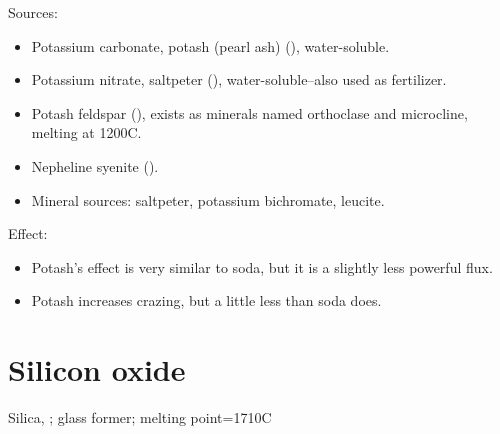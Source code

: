 Sources:
\begin{itemize}
  \item Potassium carbonate, potash (pearl ash) (), water-soluble.
  \item Potassium nitrate, saltpeter (), water-soluble--also used as 
  fertilizer.
  \item Potash feldspar (), exists as minerals named 
  orthoclase and microcline, melting at 1200\degree C.
  \item Nepheline syenite ().
  \item Mineral sources: saltpeter, potassium bichromate, leucite.
\end{itemize}
Effect:
\begin{itemize}
  \item Potash's effect is very similar to soda, but it is a slightly less 
  powerful flux.
  \item Potash increases crazing, but a little less than soda does.
\end{itemize}
\section{Silicon oxide}
Silica, ; glass former; melting point=1710\degree C

